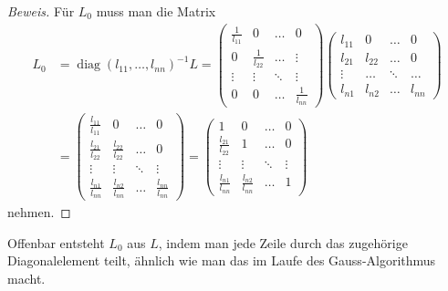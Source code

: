 \begin{proof}[Beweis]
Für $L_0$ muss man die Matrix
\begin{align*}
L_0&=
\operatorname{diag}(l_{11},\dots,l_{nn})^{-1} L
=
\begin{pmatrix}
\frac1{l_{11}}&0             &\dots &0\\
0             &\frac1{l_{22}}&\dots &\vdots\\
\vdots        &\vdots        &\ddots&\vdots\\
0             &0             &\dots &\frac1{l_{nn}}
\end{pmatrix}
\begin{pmatrix}
l_{11}&0     &\dots &0     \\
l_{21}&l_{22}&\dots &0     \\
\vdots&\dots &\ddots&\dots \\
l_{n1}&l_{n2}&\dots &l_{nn}
\end{pmatrix}
\\
&=
\begin{pmatrix}
\frac{l_{11}}{l_{11}}&0                    &\dots &0     \\
\frac{l_{21}}{l_{22}}&\frac{l_{22}}{l_{22}}&\dots &0     \\
\vdots               &\vdots               &\ddots&\vdots\\
\frac{l_{n1}}{l_{nn}}&\frac{l_{n2}}{l_{nn}}&\dots &\frac{l_{nn}}{l_{nn}}
\end{pmatrix}
=
\begin{pmatrix}
1                    &0                    &\dots &0     \\
\frac{l_{21}}{l_{22}}&1                    &\dots &0     \\
\vdots               &\vdots               &\ddots&\vdots\\
\frac{l_{n1}}{l_{nn}}&\frac{l_{n2}}{l_{nn}}&\dots &1
\end{pmatrix}
\end{align*}
nehmen.
\end{proof}
Offenbar entsteht $L_0$ aus $L$, indem man jede Zeile durch das zugehörige
Diagonalelement teilt, ähnlich wie man das im Laufe des Gauss-Algorithmus
macht.

